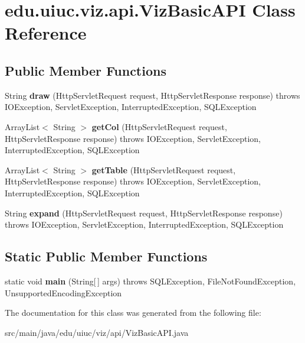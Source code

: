 \hypertarget{classedu_1_1uiuc_1_1viz_1_1api_1_1_viz_basic_a_p_i}{}\section{edu.\+uiuc.\+viz.\+api.\+Viz\+Basic\+A\+PI Class Reference}
\label{classedu_1_1uiuc_1_1viz_1_1api_1_1_viz_basic_a_p_i}
\subsection*{Public Member Functions}
\begin{DoxyCompactItemize}
\item 
\mbox{\label{classedu_1_1uiuc_1_1viz_1_1api_1_1_viz_basic_a_p_i_adbb1a2ed104907dc8408a9c4f9218614}} 
String {\bfseries draw} (Http\+Servlet\+Request request, Http\+Servlet\+Response response)  throws I\+O\+Exception, Servlet\+Exception, Interrupted\+Exception, S\+Q\+L\+Exception 
\item 
\mbox{\label{classedu_1_1uiuc_1_1viz_1_1api_1_1_viz_basic_a_p_i_a0c2d23536f9202494daf32510029812e}} 
Array\+List$<$ String $>$ {\bfseries get\+Col} (Http\+Servlet\+Request request, Http\+Servlet\+Response response)  throws I\+O\+Exception, Servlet\+Exception, Interrupted\+Exception, S\+Q\+L\+Exception 
\item 
\mbox{\label{classedu_1_1uiuc_1_1viz_1_1api_1_1_viz_basic_a_p_i_a500d3fe640725e0463a129461c8941d2}} 
Array\+List$<$ String $>$ {\bfseries get\+Table} (Http\+Servlet\+Request request, Http\+Servlet\+Response response)  throws I\+O\+Exception, Servlet\+Exception, Interrupted\+Exception, S\+Q\+L\+Exception 
\item 
\mbox{\label{classedu_1_1uiuc_1_1viz_1_1api_1_1_viz_basic_a_p_i_ae245c3e253abd0330e8c0c4897dda1eb}} 
String {\bfseries expand} (Http\+Servlet\+Request request, Http\+Servlet\+Response response)  throws I\+O\+Exception, Servlet\+Exception, Interrupted\+Exception, S\+Q\+L\+Exception 
\end{DoxyCompactItemize}
\subsection*{Static Public Member Functions}
\begin{DoxyCompactItemize}
\item 
\mbox{\label{classedu_1_1uiuc_1_1viz_1_1api_1_1_viz_basic_a_p_i_ae23b183c1ede0018c57334c922062d89}} 
static void {\bfseries main} (String\mbox{[}$\,$\mbox{]} args)  throws S\+Q\+L\+Exception, File\+Not\+Found\+Exception, Unsupported\+Encoding\+Exception
\end{DoxyCompactItemize}


The documentation for this class was generated from the following file\+:\begin{DoxyCompactItemize}
\item 
src/main/java/edu/uiuc/viz/api/Viz\+Basic\+A\+P\+I.\+java\end{DoxyCompactItemize}
